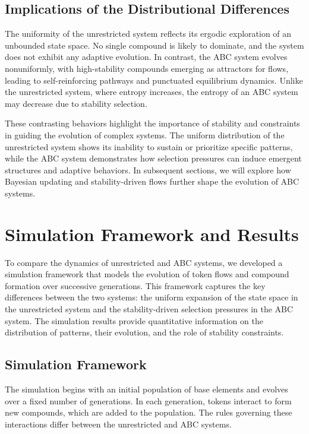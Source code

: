\documentclass[entropy,article,submit,pdftex,oneauthor]{Definitions/mdpi}
\begin{document}
\subsection{Implications of the Distributional Differences}

The uniformity of the unrestricted system reflects its ergodic exploration of an unbounded state space. No single compound is likely to dominate, and the system does not exhibit any adaptive evolution. In contrast, the ABC system evolves nonuniformly, with high-stability compounds emerging as attractors for flows, leading to self-reinforcing pathways and punctuated equilibrium \cite{gould1977punctuated} dynamics. Unlike the unrestricted system, where entropy increases, the entropy of an ABC system may decrease due to stability selection.

These contrasting behaviors highlight the importance of stability and constraints in guiding the evolution of complex systems. The uniform distribution of the unrestricted system shows its inability to sustain or prioritize specific patterns, while the ABC system demonstrates how selection pressures can induce emergent structures and adaptive behaviors. In subsequent sections, we will explore how Bayesian updating and stability-driven flows further shape the evolution of ABC systems.

\section{Simulation Framework and Results}

To compare the dynamics of unrestricted and ABC systems, we developed a simulation framework that models the evolution of token flows and compound formation over successive generations. This framework captures the key differences between the two systems: the uniform expansion of the state space in the unrestricted system and the stability-driven selection pressures in the ABC system. The simulation results provide quantitative information on the distribution of patterns, their evolution, and the role of stability constraints.

\subsection{Simulation Framework}

The simulation begins with an initial population of base elements and evolves over a fixed number of generations. In each generation, tokens interact to form new compounds, which are added to the population. The rules governing these interactions differ between the unrestricted and ABC systems.
\end{document}
